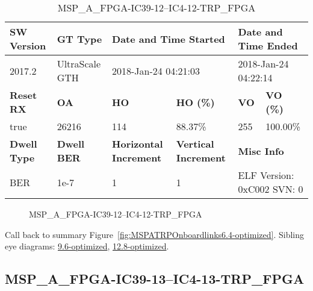 \begin{table}[h]
\centering
\caption{MSP\_A\_FPGA-IC39-12--IC4-12-TRP\_FPGA}
\label{tab:MSPAFPGAIC3912IC412TRPFPGA6.4-optimized}
\begin{tabular}{@{}|l|l|l|l|l|l|@{}}
\toprule
\textbf{SW Version}                & \textbf{GT Type}   & \multicolumn{2}{l|}{\textbf{Date and Time Started}}            & \multicolumn{2}{l|}{\textbf{Date and Time Ended}}        \\ \midrule
2017.2                       & UltraScale GTH          & \multicolumn{2}{l|}{2018-Jan-24 04:21:03}                   & \multicolumn{2}{l|}{2018-Jan-24 04:22:14}               \\ \midrule
\textbf{Reset RX}                  & \textbf{OA} & \textbf{HO}   & \textbf{HO (\%)} & \textbf{VO} & \textbf{VO (\%)} \\ \midrule
true & 26216        & 114          & 88.37\%        & 255        & 100.00\%       \\ \midrule
\textbf{Dwell Type}                & \textbf{Dwell BER} & \textbf{Horizontal Increment} & \textbf{Vertical Increment}    & \multicolumn{2}{l|}{\textbf{Misc Info}}                  \\ \midrule
BER                            & 1e-7        & 1        & 1           & \multicolumn{2}{l|}{ELF Version: 0xC002 SVN: 0}                         \\ \bottomrule
\end{tabular}
\end{table}

\begin{figure}[h]
\caption{MSP\_A\_FPGA-IC39-12--IC4-12-TRP\_FPGA} \label{fig:MSPAFPGAIC3912IC412TRPFPGA6.4-optimized}
\end{figure}

Call back to summary Figure~\ref{fig:MSPATRPOnboardlinks6.4-optimized}.
Sibling eye diagrams: \hyperref[sec:MSPAFPGAIC3912IC412TRPFPGA9.6-optimized]{9.6-optimized}, \hyperref[sec:MSPAFPGAIC3912IC412TRPFPGA12.8-optimized]{12.8-optimized}.

\clearpage
\newpage


\subsection{MSP\_A\_FPGA-IC39-13--IC4-13-TRP\_FPGA}\label{sec:MSPAFPGAIC3913IC413TRPFPGA6.4-optimized}

